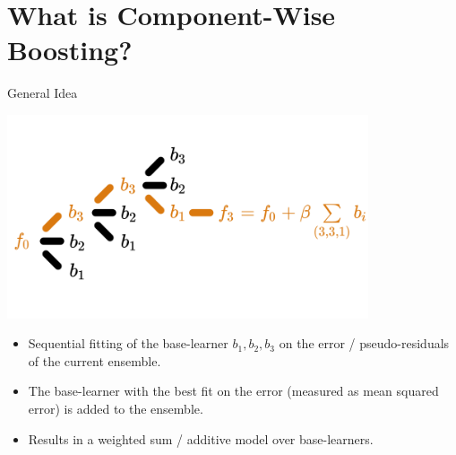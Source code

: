 \documentclass[10pt]{beamer}\usepackage[]{graphicx}\usepackage[]{color}
\begin{document}
\section{What is Component-Wise Boosting?}

\begin{frame}{General Idea}

\begin{center}
\includegraphics[width=0.8\textwidth]{./images/cboost_gif_norisk.png}
\end{center}

\vspace{-1cm}

\begin{itemize}

  \item
    Sequential fitting of the base-learner $b_1, b_2, b_3$ on the error / pseudo-residuals of the current ensemble.

  \item
    The base-learner with the best fit on the error (measured as mean squared error) is added to the ensemble.

  \item
    Results in a weighted sum / additive model over base-learners.

\end{itemize}

\end{frame}
\end{document}
